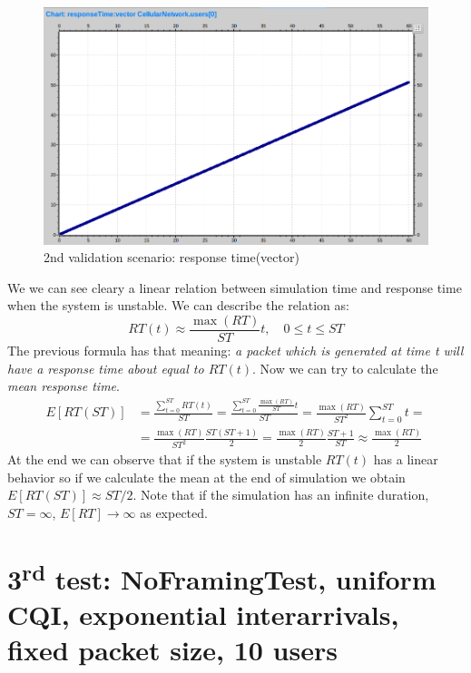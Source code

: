 \begin{figure}[H]
  \includegraphics[width=1\textwidth]{images/response-timeVec}
  \caption{2nd validation scenario: response time(vector)}
  \label{fig:2nd validation scenario: response time(vector)}
\end{figure}
We we can see cleary a linear relation between simulation time and response time when the system is unstable. We can describe the relation as:
\begin{equation} 
	RT(t) \approx \frac{\max(RT)}{ST}t, \quad 0\le t \le ST 
\end{equation}
The previous formula has that meaning: \textit{a packet which is generated at time t will have a response time about equal to \(RT(t)\)}. Now we can try to calculate the \textit{mean response time}.
\begin{equation}
\begin{split}
E[RT(ST)] &= \frac{\sum\limits^{ST}_{t=0} RT(t)}{ST} = \frac{\sum\limits^{ST}_{t=0} \frac{\max(RT)}{ST}t}{ST} = \frac{\max(RT)}{ST^2}\sum\limits^{ST}_{t=0}t =
	\\ &= \frac{\max(RT)}{ST^2}\frac{ST(ST+1)}{2} = \frac{\max(RT)}{2}\frac{ST+1}{ST} \approx \frac{\max(RT)}{2}
\end{split}
\end{equation}
At the end we can observe that if the system is unstable \(RT(t)\) has a linear behavior so if we calculate the mean at the end of simulation we obtain \(E[RT(ST)] \approx ST/2\). Note that if the simulation has an infinite duration, \(ST=\infty\), \(E[RT] \rightarrow \infty \) as expected.

\section{3\textsuperscript{rd} test: NoFramingTest, uniform CQI, exponential interarrivals, fixed packet size, 10 users}

